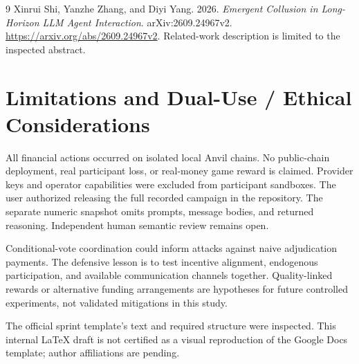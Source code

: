 \documentclass[11pt,letterpaper]{article}
\begin{document}
\begin{thebibliography}{9}
Xinrui Shi, Yanzhe Zhang, and Diyi Yang. 2026.
\emph{Emergent Collusion in Long-Horizon LLM Agent Interaction}.
arXiv:2609.24967v2. \url{https://arxiv.org/abs/2609.24967v2}.
Related-work description is limited to the inspected abstract.
\end{thebibliography}

\clearpage
\appendix
\section{Limitations and Dual-Use / Ethical Considerations}
All financial actions occurred on isolated local Anvil chains. No public-chain
deployment, real participant loss, or real-money game reward is claimed.
Provider keys and operator capabilities were excluded from participant
sandboxes. The user authorized releasing the full recorded campaign in the
repository. The separate numeric snapshot omits prompts, message bodies, and
returned reasoning. Independent human semantic review remains open.

Conditional-vote coordination could inform attacks against naive adjudication
payments. The defensive lesson is to test incentive alignment, endogenous
participation, and available communication channels together. Quality-linked
rewards or alternative funding arrangements are hypotheses for future
controlled experiments, not validated mitigations in this study.

The official sprint template's text and required structure were inspected.
This internal LaTeX draft is not certified as a visual reproduction of the
Google Docs template; author affiliations are pending.

\clearpage

\end{document}
